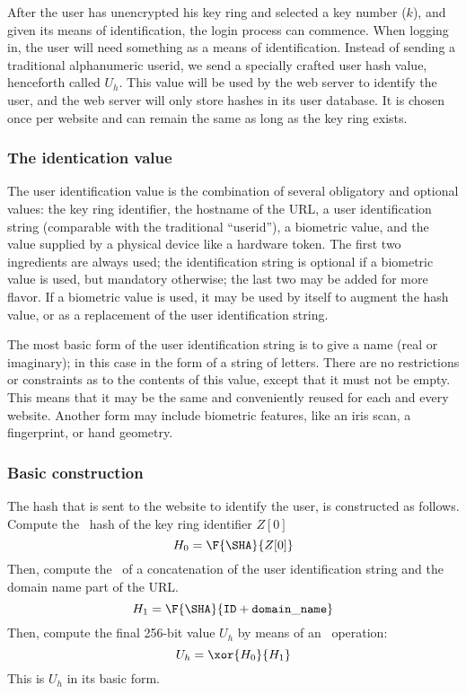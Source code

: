 %
%
%
\label{logging_in}
After the user has unencrypted his key ring and selected a key number ($k$),
and given its means of identification,
the login process can commence.
\label{sec:user_ids}
When logging in,
the user will need something as a means of identification.
Instead of sending a traditional alphanumeric userid,
we send a specially crafted user hash value,
henceforth called $U_h$.
This value will be used by the web server to identify the user,
and the web server will only store hashes in its user database.
It is chosen once per website and can remain the same as long as the key ring exists.
\subsubsection{The identication value}
The user identification value is the combination of several obligatory and optional values:
the key ring identifier,
the hostname of the URL,
a user identification string
(comparable with the traditional ``userid''),
a biometric value,
and the value supplied by a physical device like a hardware token.
The first two ingredients are always used;
the identification string is optional if a biometric value is used, but mandatory otherwise;
the last two may be added for more flavor.
If a biometric value is used,
it may be used by itself to augment the hash value,
or as a replacement of the user identification string.
\par
The most basic form of the user identification string is to give a name
(real or imaginary);
in this case in the form of a string of letters.
There are no restrictions or constraints as to the contents of this value,
except that it must not be empty.
This means that it may be the same and conveniently reused for each and every website.
Another form may include biometric features,
like an iris scan,
a fingerprint,
or hand geometry.
\subsubsection{Basic construction}
The hash that is sent to the website to identify the user,
is constructed as follows.
Compute the \SHA\ hash of the key ring identifier $Z[0]$
\[H_0=\F{\SHA}{Z[0]}\]
Then,
compute the \SHA\ of a concatenation of the user identification string
and the domain name part of the URL.
\[H_1=\F{\SHA}{\mathtt{ID+domain\_name}}\]
Then, compute the final 256-bit value $U_h$ by means of an \XOR\ operation:
\[U_h=\xor{H_0}{H_1}\]
This is $U_h$ in its basic form.
